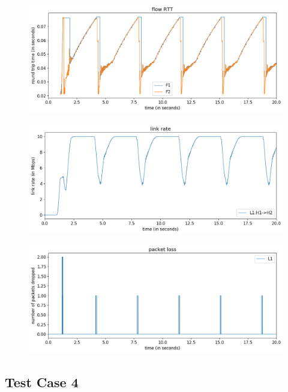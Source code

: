 \documentclass{article}
\begin{document}
\begin{figure}[H]
\centering
\includegraphics[width = \textwidth]{test_case3 flow RTT.png}
\end{figure}

\begin{figure}[H]
\centering
\includegraphics[width = \textwidth]{test_case3 link rate.png}
\end{figure}

\begin{figure}[H]
\centering
\includegraphics[width = \textwidth]{test_case3 packet loss.png}
\end{figure}


\subsection{Test Case 4}
\end{document}
